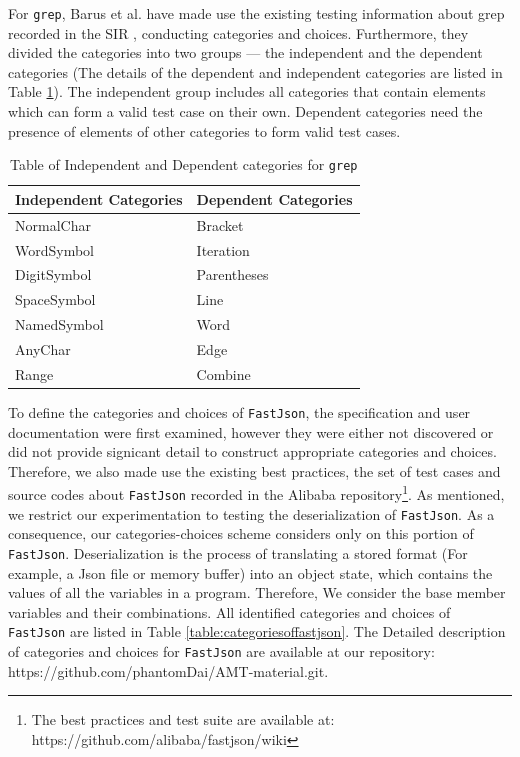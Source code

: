 \documentclass[10pt,journal,compsoc]{IEEEtran}
\begin{document}
For \texttt{grep}, Barus et al. \cite{barus2014novel} have made use the existing testing information about grep recorded in the SIR \cite{do2005supporting}, conducting categories and choices. Furthermore, they divided the categories into two groups --- the independent and the dependent categories (The details of the dependent and independent categories are listed in Table \ref{table:categoriesofgrep}). The independent group includes all categories that contain elements which can form a valid test case on their own. Dependent categories need the presence of elements of other categories to form valid test cases.

\begin{table}[htb]
  \caption{Table of Independent and Dependent categories for \texttt{grep}}
  \label{table:categoriesofgrep}
  \centering
  \begin{tabular}{ll} \toprule
  Independent Categories    &Dependent Categories \\ \midrule
  NormalChar                &Bracket \\
  WordSymbol                &Iteration \\
  DigitSymbol               &Parentheses\\
  SpaceSymbol               &Line \\
  NamedSymbol               &Word \\
  AnyChar                   &Edge \\
  Range                     &Combine \\ \bottomrule
  \end{tabular}
\end{table}


To define the categories and choices of \texttt{FastJson}, the specification and user documentation were first examined, however they were either not discovered or did not provide signicant detail to construct appropriate categories and choices. Therefore, we also made use the existing best practices, the set of test cases and source codes about \texttt{FastJson} recorded in the Alibaba repository\footnote{The best practices and test suite are available at: https://github.com/alibaba/fastjson/wiki}. As mentioned, we restrict our experimentation to testing the deserialization of \texttt{FastJson}. As a consequence, our categories-choices scheme considers only on this portion of \texttt{FastJson}. Deserialization is the process of translating a stored format (For example, a Json file or memory buffer) into an object state, which contains the values of all the variables in a program. Therefore, We consider the base member variables and their combinations. All identified categories and choices of \texttt{FastJson}
are listed in Table \ref{table:categoriesoffastjson}. The Detailed description of categories and choices for \texttt{FastJson} are available at our repository: https://github.com/phantomDai/AMT-material.git.
\end{document}
